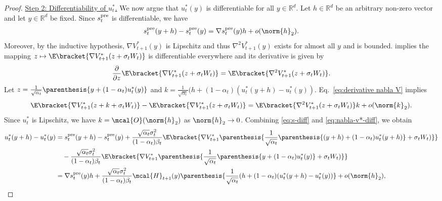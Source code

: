 \documentclass{article}
\newcommand{\R}{\mathbb{R}}
\begin{document}
\begin{proof}
%
%
%
%

%
%
%
%
%
%
%
%
%
%

\underline{Step 2: Differentiability of $ u_{t}^{*} $.} We now argue that $ u_t^*(y)$ is differentiable for all $y\in \mathbb{R}^d$. Let $h \in \R^d$ be an arbitrary non-zero vector and let $y \in \R^d$ be fixed. Since $s_t^{\rm pre}$ is differentiable, we have
\begin{align}
    s_t^{\rm pre}(y + h) - s_t^{\rm pre}(y) = \nabla s_t^{\rm pre}(y) h + o(\norm{h}_2). \label{eq:s-diff}
\end{align}
Moreover, by the inductive hypothesis, $\nabla V_{t+1}^*(y)$ is Lipschitz and thus $\nabla^2 V_{t+1}^*(y)$ exists for almost all $y$ and is bounded. \cite[Theorem 2.27]{folland1999real} implies the mapping $z \mapsto \E\bracket{\nabla V^{*}_{t+1}(z + \sigma_t W_t)}$ is differentiable everywhere and its derivative is given by
\begin{align}\label{eq:derivative nabla V}
    \frac{\partial}{\partial z}\E\bracket{\nabla V^{*}_{t+1}(z + \sigma_t W_t)} = \E\bracket{\nabla^2 V^{*}_{t+1}(z + \sigma_t W_t)}. 
\end{align}
Let $z = \frac{1}{\sqrt{\alpha_t}}\parenthesis{y + (1 - \alpha_t)u_t^*(y)} $ and $k = \frac{1}{\sqrt{\alpha_t}}(h + (1 - \alpha_t)(u_t^{*}(y+h) - u_t^{*}(y))$. Eq.~\eqref{eq:derivative nabla V} implies
\begin{align}
    \E\bracket{\nabla V^{*}_{t+1}(z + k + \sigma_t W_t)} - \E\bracket{\nabla V^{*}_{t+1}(z + \sigma_t W_t)} = \E\bracket{\nabla^2 V_{t+1}^*(z + \sigma_t W_t)}k + o(\norm{k}_2). \label{eq:nabla-v*-diff}
\end{align}
Since $u_t^*$ is Lipschitz, we have $k = \mcal{O}(\norm{h}_2)$ as $\norm{h}_2 \to 0$. Combining \eqref{eq:s-diff} and \eqref{eq:nabla-v*-diff}, we obtain
\begin{align*}
    u_t^*(y+h) - u_t^*(y) & = s_{t}^{\rm pre}(y+h) - s_{t}^{\rm pre}(y)  + \frac{\sqrt{\alpha_{t}}\sigma_{t}^{2}}{(1 - \alpha_{t})\beta_t}\E\bracket{\nabla V_{t+1}^{*}\parenthesis{\frac{1}{\sqrt{\alpha_t}}\parenthesis{(y+h) + (1 - \alpha_t)u_t^*(y+h)} + \sigma_t W_t)}} \\ & \quad - \frac{\sqrt{\alpha_{t}}\sigma_{t}^{2}}{(1 - \alpha_{t})\beta_t}\E\bracket{\nabla V_{t+1}^{*}\parenthesis{\frac{1}{\sqrt{\alpha_t}}\parenthesis{y + (1 - \alpha_t)u_t^*(y)} + \sigma_t W_t)}} \\ & = \nabla s_t^{\rm pre}(y) h  + \frac{\sqrt{\alpha_{t}}\sigma_{t}^{2}}{(1 - \alpha_{t})\beta_t}\mcal{H}_{t+1}(y)\parenthesis{\frac{1}{\sqrt{\alpha_t}}(h + (1 - \alpha_t)(u_t^{*}(y+h) - u_t^{*}(y))} + o(\norm{h}_2),

\end{align*}
\end{proof}
\end{document}
